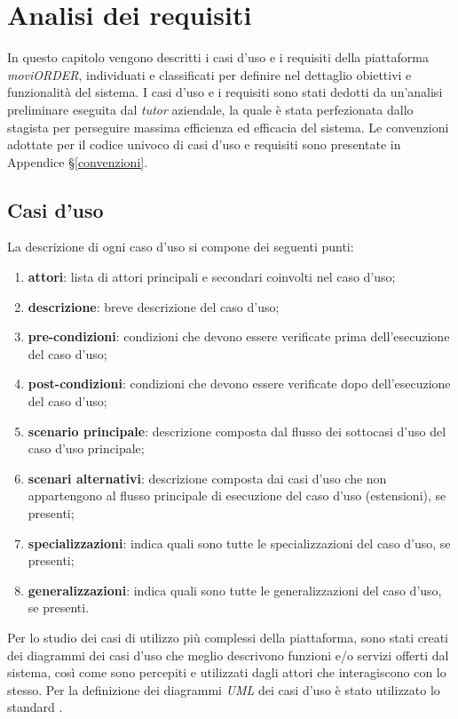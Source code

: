 
\chapter{Analisi dei requisiti}
\label{cap:analisi-requisiti}

In questo capitolo vengono descritti i casi d'uso e i requisiti della piattaforma \textit{moviORDER}, individuati e classificati per definire nel dettaglio obiettivi e funzionalità del sistema. I casi d'uso e i requisiti sono stati dedotti da un'analisi preliminare eseguita dal \textit{tutor} aziendale, la quale è stata perfezionata dallo stagista per perseguire massima efficienza ed efficacia del sistema. Le convenzioni adottate per il codice univoco di casi d'uso e requisiti sono presentate in Appendice §\ref{convenzioni}.

\section{Casi d'uso}

La descrizione di ogni caso d'uso si compone dei seguenti punti:
\begin{enumerate}
	\item \textbf{attori}: lista di attori principali e secondari coinvolti nel caso d'uso;
    \item \textbf{descrizione}: breve descrizione del caso d'uso;
    \item \textbf{pre-condizioni}: condizioni che devono essere verificate prima dell'esecuzione del caso d'uso;
    \item \textbf{post-condizioni}: condizioni che devono essere verificate dopo dell'esecuzione del caso d'uso;
    \item \textbf{scenario principale}: descrizione composta dal flusso dei sottocasi d'uso del caso d'uso principale;
    \item \textbf{scenari alternativi}: descrizione composta dai casi d'uso che non appartengono al flusso
    principale di esecuzione del caso d'uso (estensioni), se presenti;
    \item \textbf{specializzazioni}: indica quali sono tutte le specializzazioni del caso d'uso, se presenti;
    \item \textbf{generalizzazioni}: indica quali sono tutte le generalizzazioni del caso d'uso, se presenti.
\end{enumerate}
Per lo studio dei casi di utilizzo più complessi della piattaforma, sono stati creati dei diagrammi dei casi d'uso che meglio descrivono funzioni e/o servizi offerti dal sistema, così come sono percepiti e utilizzati dagli attori che interagiscono con lo stesso. Per la definizione dei diagrammi \textit{UML} dei casi d'uso è stato utilizzato lo standard . 

